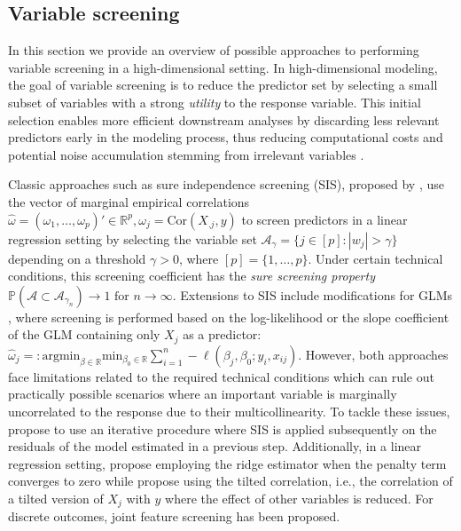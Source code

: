 \documentclass[
  article]{jss}
\begin{document}
\subsection{Variable screening}\label{variable-screening}

In this section we provide an overview of possible approaches to
performing variable screening in a high-dimensional setting. In
high-dimensional modeling, the goal of variable screening is to reduce
the predictor set by selecting a small subset of variables with a strong
\emph{utility} to the response variable. This initial selection enables
more efficient downstream analyses by discarding less relevant
predictors early in the modeling process, thus reducing computational
costs and potential noise accumulation stemming from irrelevant
variables \citep[see e.g.,][]{Dunson2020TargRandProj}.

Classic approaches such as sure independence screening (SIS), proposed
by \citet{Fan2007SISforUHD}, use the vector of marginal empirical
correlations
\(\hat\omega=(\omega_1,\ldots ,\omega_p)'\in\mathbb{R}^p,\omega_j=\text{Cor}(X_{.j},y)\)
to screen predictors in a linear regression setting by selecting the
variable set \(\mathcal{A}_\gamma = \{j\in [p]:|w_j|>\gamma\}\)
depending on a threshold \(\gamma>0\), where \([p]=\{1,\dots,p\}\).
Under certain technical conditions, this screening coefficient has the
\emph{sure screening property}
\(\mathbb{P}(\mathcal{A} \subset \mathcal{A}_{\gamma_n})\to 1 \text{ for } n\to \infty\).
Extensions to SIS include modifications for GLMs \citep{Fan2010sisglms},
where screening is performed based on the log-likelihood or the slope
coefficient of the GLM containing only \(X_j\) as a predictor:
\(\hat\omega_j=: \text{argmin}_{\beta\in\mathbb{R}}\text{min}_{{\beta_0}\in\mathbb{R}}\sum_{i=1}^n -\ell(\beta_j,\beta_0;y_i,x_{ij})\).
However, both approaches face limitations related to the required
technical conditions which can rule out practically possible scenarios
where an important variable is marginally uncorrelated to the response
due to their multicollinearity. To tackle these issues,
\citet{fan2009ultrahigh} propose to use an iterative procedure where SIS
is applied subsequently on the residuals of the model estimated in a
previous step. Additionally, in a linear regression setting,
\citet{Wang2015HOLP} propose employing the ridge estimator when the
penalty term converges to zero while \citet{cho2012high} propose using
the tilted correlation, i.e., the correlation of a tilted version of
\(X_j\) with \(y\) where the effect of other variables is reduced. For
discrete outcomes, joint feature screening \citep{SMLE2014} has been
proposed.
\end{document}
